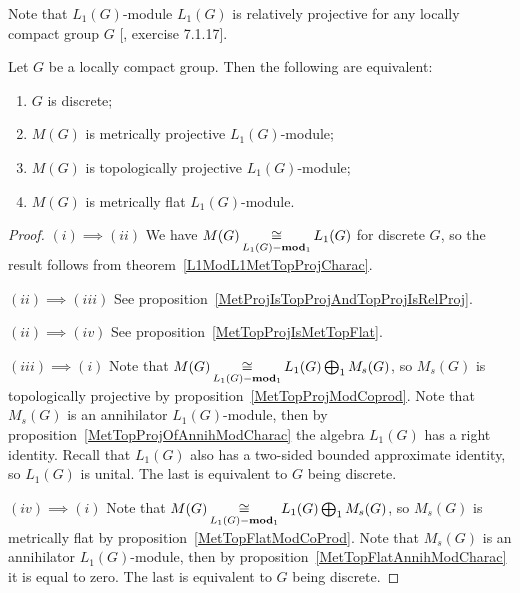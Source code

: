 Note that $L_1(G)$-module $L_1(G)$ is relatively projective for any locally
compact group $G$ [\cite{HelBanLocConvAlg}, exercise 7.1.17].

\begin{proposition}\label{L1MetTopProjAndMetrFlatOfMeasAlg} Let $G$ be 
a locally compact group. Then the following are equivalent:

\begin{enumerate}[label = (\roman*)]
    \item $G$ is discrete;

    \item $M(G)$ is metrically projective $L_1(G)$-module;

    \item $M(G)$ is topologically projective $L_1(G)$-module;

    \item $M(G)$ is metrically flat $L_1(G)$-module.
\end{enumerate}
\end{proposition}
\begin{proof} 
$(i)\implies (ii)$ We have $M(G)\mathop{\mathbin{\cong}}\limits_{L_1(G)-\mathbf{mod}_1}L_1(G)$ for
discrete $G$, so the result follows from theorem~\ref{L1ModL1MetTopProjCharac}. 

$(ii)\implies (iii)$ See
proposition~\ref{MetProjIsTopProjAndTopProjIsRelProj}.

$(ii)\implies (iv)$ See proposition~\ref{MetTopProjIsMetTopFlat}.

$(iii)\implies (i)$ Note that $M(G)\mathop{\mathbin{\cong}}\limits_{L_1(G)-\mathbf{mod}_1}
L_1(G)\bigoplus_1 M_s(G)$, so $M_s(G)$ is topologically projective by
proposition~\ref{MetTopProjModCoprod}. Note that $M_s(G)$ is an annihilator
$L_1(G)$-module, then by proposition~\ref{MetTopProjOfAnnihModCharac} the
algebra $L_1(G)$ has a right identity. Recall that $L_1(G)$ also has a two-sided
bounded approximate identity, so $L_1(G)$ is unital. The last is equivalent to
$G$ being discrete.

$(iv)\implies (i)$ Note that $M(G)\mathop{\mathbin{\cong}}\limits_{L_1(G)-\mathbf{mod}_1}
L_1(G)\bigoplus_1 M_s(G)$, so $M_s(G)$ is metrically flat by
proposition~\ref{MetTopFlatModCoProd}. Note that $M_s(G)$ is an annihilator
$L_1(G)$-module, then by proposition~\ref{MetTopFlatAnnihModCharac} it is equal
to zero. The last is equivalent to $G$ being discrete.
\end{proof}

